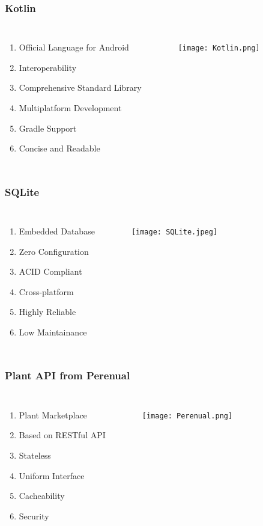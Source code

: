 \documentclass[xcolor=table]{beamer}
\begin{document}
\begin{frame}[fragile]
\frametitle{Kotlin}
\begin{columns}
   \begin{enumerate}
    \item Official Language for Android
    \bigskip
    \item Interoperability
    \bigskip
    \item Comprehensive Standard Library
    \bigskip
    \item Multiplatform Development
    \bigskip
    \item Gradle Support
    \bigskip
    \item Concise and Readable
    
  \end{enumerate}
    \begin{figure}[H]
    \texttt{[image: Kotlin.png]}
    \end{figure}
    \end{columns}
\end{frame}

\begin{frame}[fragile]
\frametitle{SQLite}
\begin{columns}
   \begin{enumerate}
    \item Embedded Database
    \bigskip
    \item Zero Configuration
    \bigskip
    \item ACID Compliant
    \bigskip
    \item Cross-platform
    \bigskip
    \item Highly Reliable
    \bigskip
    \item Low Maintainance
  \end{enumerate}
    \begin{figure}[H]
    \texttt{[image: SQLite.jpeg]}
    \end{figure}
    \end{columns}
\end{frame}

\begin{frame}[fragile]
\frametitle{Plant API from Perenual}
\begin{columns}
   \begin{enumerate}
    \item Plant Marketplace
    \bigskip
    \item Based on RESTful API
    \bigskip
    \item Stateless
    \bigskip
    \item Uniform Interface
    \bigskip
    \item Cacheability
    \bigskip
    \item Security
  \end{enumerate}
    \begin{figure}[H]
    \texttt{[image: Perenual.png]}
    \end{figure}
    \end{columns}
\end{frame}
\end{document}
